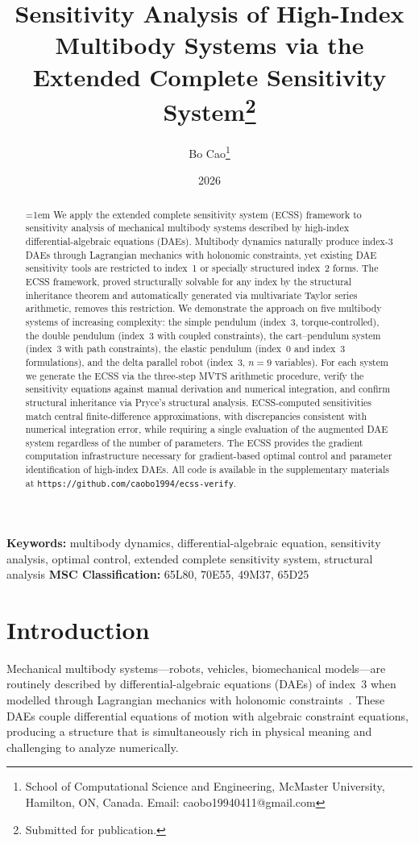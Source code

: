 \documentclass[12pt,a4paper]{article}
\title{\bfseries Sensitivity Analysis of High-Index Multibody Systems via the Extended Complete Sensitivity System\thanks{Submitted for publication.}}
\author{Bo Cao\thanks{School of Computational Science and Engineering, McMaster University, Hamilton, ON, Canada. Email: caobo19940411@gmail.com}}
\date{2026}
\theoremstyle{definition}
\theoremstyle{plain}
\newcommand{\keywords}[1]{\noindent\textbf{Keywords:} #1}
\newcommand{\MSC}[1]{\noindent\textbf{MSC Classification:} #1}
\begin{document}
\maketitle

\begin{abstract}
\emergencystretch=1em
We apply the extended complete sensitivity system (ECSS) framework to sensitivity analysis of mechanical multibody systems described by high-index differential-algebraic equations (DAEs). Multibody dynamics naturally produce index-3 DAEs through Lagrangian mechanics with holonomic constraints, yet existing DAE sensitivity tools are restricted to index~1 or specially structured index~2 forms. The ECSS framework, proved structurally solvable for any index by the structural inheritance theorem and automatically generated via multivariate Taylor series arithmetic, removes this restriction. We demonstrate the approach on five multibody systems of increasing complexity: the simple pendulum (index~3, torque-controlled), the double pendulum (index~3 with coupled constraints), the cart--pendulum system (index~3 with path constraints), the elastic pendulum (index~0 and index~3 formulations), and the delta parallel robot (index~3, $n=9$ variables). For each system we generate the ECSS via the three-step MVTS arithmetic procedure, verify the sensitivity equations against manual derivation and numerical integration, and confirm structural inheritance via Pryce's structural analysis. ECSS-computed sensitivities match central finite-difference approximations, with discrepancies consistent with numerical integration error, while requiring a single evaluation of the augmented DAE system regardless of the number of parameters. The ECSS provides the gradient computation infrastructure necessary for gradient-based optimal control and parameter identification of high-index DAEs. All code is available in the supplementary materials at \texttt{https://github.com/caobo1994/ecss-verify}.
\end{abstract}
\emergencystretch=0pt

\keywords{multibody dynamics, differential-algebraic equation, sensitivity analysis, optimal control, extended complete sensitivity system, structural analysis}
\MSC{65L80, 70E55, 49M37, 65D25}

\section{Introduction}

Mechanical multibody systems---robots, vehicles, biomechanical models---are routinely described by differential-algebraic equations (DAEs) of index~3 when modelled through Lagrangian mechanics with holonomic constraints~\cite{arnold1995numerical,gerdts2001numerical}. These DAEs couple differential equations of motion with algebraic constraint equations, producing a structure that is simultaneously rich in physical meaning and challenging to analyze numerically.
\end{document}
